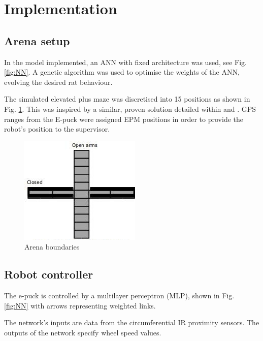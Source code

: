 \section{Implementation}

\subsection{Arena setup}

In the model implemented, an ANN with fixed architecture was used, see Fig. \ref{fig:NN}. A genetic algorithm was used to optimise the weights of the ANN, evolving the desired rat behaviour. 

The simulated elevated plus maze was discretised into 15 positions as shown in Fig. \ref{fig:arena-disc}. This was inspired by a similar, proven solution detailed within \citeauthor{Costa201444} and \citeauthor{Costa2016102}. \cite{Costa201444} \cite{Costa2016102} GPS ranges from the E-puck were assigned EPM positions in order to provide the robot's position to the supervisor.


\begin{figure}[H]
	\centering
	\includegraphics[width=0.7\linewidth]{arena-disc}
	\caption{Arena boundaries}
	\label{fig:arena-disc}
\end{figure}

\subsection{Robot controller}

The e-puck is controlled by a multilayer perceptron (MLP), shown in Fig. \ref{fig:NN} with arrows representing weighted links. 

The network's inputs are data from the circumferential IR proximity sensors. The outputs of the network specify wheel speed values. 

